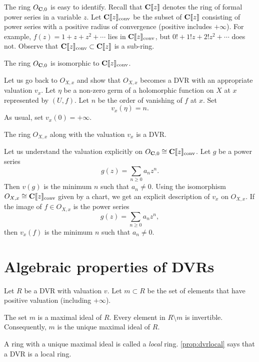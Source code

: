 \documentclass[12pt]{article}
\begin{document}
The ring $O_{{\bf C}, 0}$ is easy to identify.
Recall that ${\bf C}\llbracket z \rrbracket$ denotes the ring of formal power series in a variable $z$.
Let ${\bf C}\llbracket z \rrbracket_{\rm conv}$ be the subset of ${\bf C}\llbracket z \rrbracket$ consisting of power series with a positive radius of convergence (positive includes $+\infty$).
For example, $f(z) = 1 + z + z^2 + \cdots$ lies in ${\bf C}\llbracket z \rrbracket_{\rm conv}$, but $0! + 1! z + 2! z^2 + \cdots$ does not.
Observe that ${\bf C}\llbracket z \rrbracket_{\rm conv} \subset {\bf C} \llbracket z \rrbracket$ is a sub-ring.
\begin{proposition}
  The ring $O_{{\bf C}, 0}$ is isomorphic to ${\bf C}\llbracket z \rrbracket_{\rm conv}$.
\end{proposition}

Let us go back to $O_{X,x}$ and show that $O_{X,x}$ becomes a DVR with an appropriate valuation $v_x$.
Let $\eta$ be a non-zero germ of a holomorphic function on $X$ at $x$ represented by $(U, f)$.
Let $n$ be the order of vanishing of $f$ at $x$.
Set
\[ v_x(\eta) = n.\]
As usual, set $v_x(0) = +\infty$.
\begin{proposition}
  The ring $O_{X,x}$ along with the valuation $v_x$ is a DVR.
\end{proposition}

Let us understand the valuation explicitly on $O_{{\bf C}, 0} \cong {\bf C}\llbracket z \rrbracket_{\rm conv}$.
Let $g$ be a power series
\[ g(z) = \sum_{n \geq 0} a_n z^n.\]
Then $v(g)$ is the minimum $n$ such that $a_n \neq 0$.
Using the isomorphism $O_{X,x} \cong {\bf C}\llbracket z \rrbracket_{\rm conv}$ given by a chart, we get an explicit description of $v_x$ on $O_{X,x}$.
If the image of $f \in O_{X,x}$ is the power series
\[ g(z) = \sum_{n \geq 0} a_n z^n,\]
then $v_x(f)$ is the minimum $n$ such that $a_n \neq 0$.

\section{Algebraic properties of DVRs}
Let $R$ be a DVR with valuation $v$.
Let $m \subset R$ be the set of elements that have positive valuation (including $+\infty$).
\begin{proposition}\label{prop:dvrlocal}
  The set $m$ is a maximal ideal of $R$.
  Every element in $R \setminus m$ is invertible.
  Consequently, $m$ is the unique maximal ideal of $R$.
\end{proposition}
A ring with a unique maximal ideal is called a \emph{local} ring.
\autoref{prop:dvrlocal} says that a DVR is a local ring.
\end{document}
